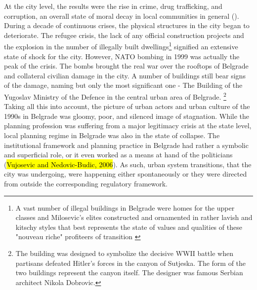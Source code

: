 \documentclass[11pt]{report}
\begin{document}
At the city level, the results were the rise in crime, drug trafficking, and corruption, an overall state of moral decay in local communities in general (\cite{Prodanovic Stariji i lepsi Beograd}).
\\
During a decade of continuous crises, the physical structures in the city began to deteriorate.
The refugee crisis, the lack of any official construction projects and the explosion in the number of illegally built dwellings\footnote{A vast number of illegal buildings in Belgrade were homes for the upper classes and Milosevic's elites constructed and ornamented in rather lavish and kitschy styles that best represents the state of values and qualities of these "nouveau riche" profiteers of transition \cite{(Hirt 2009)}}
signified an extensive state of shock for the city.
However, NATO bombing in 1999 was actually the peak of the crisis. The bombs brought the real war over the rooftops of Belgrade and collateral civilian damage in the city.
A number of buildings still bear signs of the damage, naming but only the most significant one - The Building of the Yugoslav Ministry of the Defence in the central urban area of Belgrade.
\footnote{The building was designed to symbolize the decisive WWII battle when partisans defeated Hitler's forces in the canyon of Sutjeska. The form of the two buildings represent the canyon itself. The designer was famous Serbian architect Nikola Dobrovic.}
\\
Taking all this into account, the picture of urban actors and urban culture of the 1990s in Belgrade was gloomy, poor, and silenced image of stagnation.
While the planning profession was suffering from a major legitimacy crisis at the state level, local planning regime in Belgrade was also in the state of collapse.
The institutional framework and planning practice in Belgrade had rather a symbolic and superficial role, or it even worked as a means at hand of the politicians (\hl{Vujosevic and Nedovic-Budic, 2006}). As such, urban system transitions, that the city was undergoing, were happening either spontaneously or they were directed from outside the corresponding regulatory framework.
\end{document}
